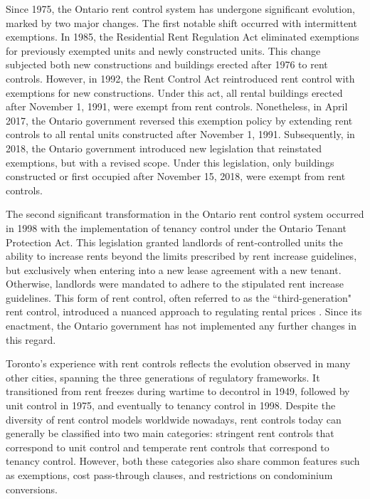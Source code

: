 \documentclass[parskip=full]{article}
\begin{document}
Since 1975, the Ontario rent control system has undergone significant evolution, marked by two major changes. The first notable shift occurred with intermittent exemptions. In 1985, the Residential Rent Regulation Act eliminated exemptions for previously exempted units and newly constructed units. This change subjected both new constructions and buildings erected after 1976 to rent controls. However, in 1992, the Rent Control Act reintroduced rent control with exemptions for new constructions. Under this act, all rental buildings erected after November 1, 1991, were exempt from rent controls. Nonetheless, in April 2017, the Ontario government reversed this exemption policy by extending rent controls to all rental units constructed after November 1, 1991. Subsequently, in 2018, the Ontario government introduced new legislation that reinstated exemptions, but with a revised scope. Under this legislation, only buildings constructed or first occupied after November 15, 2018, were exempt from rent controls.

The second significant transformation in the Ontario rent control system occurred in 1998 with the implementation of tenancy control under the Ontario Tenant Protection Act. This legislation granted landlords of rent-controlled units the ability to increase rents beyond the limits prescribed by rent increase guidelines, but exclusively when entering into a new lease agreement with a new tenant. Otherwise, landlords were mandated to adhere to the stipulated rent increase guidelines. This form of rent control, often referred to as the ``third-generation" rent control, introduced a nuanced approach to regulating rental prices \citep{arnott-2003}. Since its enactment, the Ontario government has not implemented any further changes in this regard.

Toronto's experience with rent controls reflects the evolution observed in many other cities, spanning the three generations of regulatory frameworks. It transitioned from rent freezes during wartime to decontrol in 1949, followed by unit control in 1975, and eventually to tenancy control in 1998. Despite the diversity of rent control models worldwide nowadays, rent controls today can generally be classified into two main categories: stringent rent controls that correspond to unit control and temperate rent controls that correspond to tenancy control. However, both these categories also share common features such as exemptions, cost pass-through clauses, and restrictions on condominium conversions. 
\end{document}
